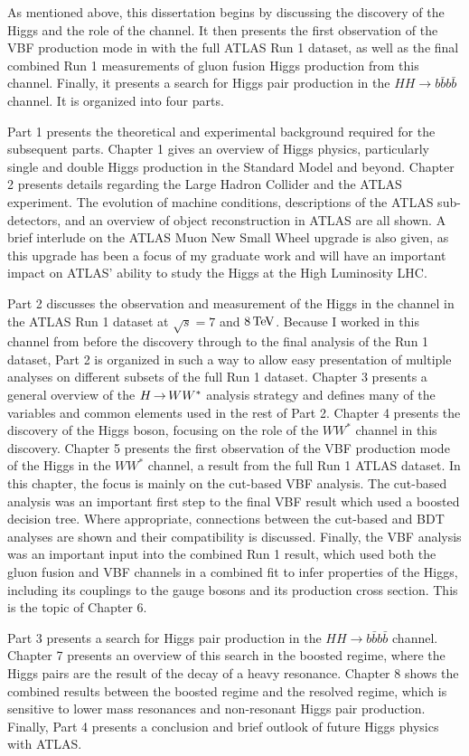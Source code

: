 As mentioned above, this dissertation begins by discussing the discovery of the Higgs and the role of the \HWWfull channel. It then presents the first observation of the VBF production mode in \HWWfull with the full ATLAS Run 1 dataset, as well as the final combined Run 1 measurements of gluon fusion Higgs production from this channel. Finally, it presents a search for Higgs pair production in the $HH\to b\bar{b}b\bar{b}$ channel. It is organized into four parts. 

Part 1 presents the theoretical and experimental background required for the subsequent parts. Chapter 1 gives an overview of Higgs physics, particularly single and double Higgs production in the Standard Model and beyond. Chapter 2 presents details regarding the Large Hadron Collider and the ATLAS experiment. The evolution of machine conditions, descriptions of the ATLAS sub-detectors, and an overview of object reconstruction in ATLAS are all shown. A brief interlude on the ATLAS Muon New Small Wheel upgrade is also given, as this upgrade has been a focus of my graduate work and will have an important impact on ATLAS' ability to study the Higgs at the High Luminosity LHC. 

Part 2 discusses the observation and measurement of the Higgs in the \HWWfull channel in the ATLAS Run 1 dataset at $\sqrt{s} = 7$ and $8 \TeV$. Because I worked in this channel from before the discovery through to the final analysis of the Run 1 dataset, Part 2 is organized in such a way to allow easy presentation of multiple analyses on different subsets of the full Run 1 dataset. Chapter 3 presents a general overview of the $H{\,{\rightarrow}\,}WW^\ast$ analysis strategy and defines many of the variables and common elements used in the rest of Part 2. Chapter 4 presents the discovery of the Higgs boson, focusing on the role of the $WW^*$ channel in this discovery. Chapter 5 presents the first observation of the VBF production mode of the Higgs in the $WW^*$ channel, a result from the full Run 1 ATLAS dataset. In this chapter, the focus is mainly on the cut-based VBF analysis. The cut-based analysis was an important first step to the final VBF result which used a boosted decision tree. Where appropriate, connections between the cut-based and BDT analyses are shown and their compatibility is discussed. Finally, the VBF analysis was an important input into the combined Run 1 \HWWfull result, which used both the gluon fusion and VBF channels in a combined fit to infer properties of the Higgs, including its couplings to the gauge bosons and its production cross section. This is the topic of Chapter 6. 

Part 3 presents a search for Higgs pair production in the $HH \to b\bar{b} b\bar{b}$ channel. Chapter 7 presents an overview of this search in the boosted regime, where the Higgs pairs are the result of the decay of a heavy resonance. Chapter 8 shows the combined results between the boosted regime and the resolved regime, which is sensitive to lower mass resonances and non-resonant Higgs pair production. Finally, Part 4 presents a conclusion and brief outlook of future Higgs physics with ATLAS.